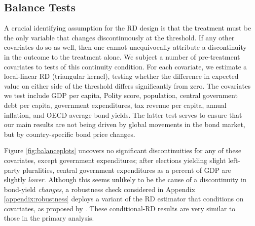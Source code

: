 \documentclass[12pt]{article}
\begin{document}
\subsection{Balance Tests}

A crucial identifying assumption for the RD design is that the treatment must be the only variable that changes discontinuously at the threshold. If any other covariates do so as well, then one cannot unequivocally attribute a discontinuity in the outcome to the treatment alone. We subject a number of pre-treatment covariates to tests of this continuity condition. For each covariate, we estimate a local-linear RD (triangular kernel), testing whether the difference in expected value on either side of the threshold differs significantly from zero. The covariates we test include GDP per capita, Polity score, population, central government debt per capita, government expenditures, tax revenue per capita, annual inflation, and OECD average bond yields. The latter test serves to ensure that our main results are not being driven by global movements in the bond market, but by country-specific bond price changes. 

Figure \ref{fig:balanceplots} uncovers no significant discontinuities for any of these covariates, except government expenditures; after elections yielding slight left-party pluralities, central government expenditures as a percent of GDP are slightly \textit{lower}. Although this seems unlikely to be the cause of a discontinuity in bond-yield \textit{changes}, a robustness check considered in Appendix \ref{appendix:robustness} deploys a variant of the RD estimator that conditions on covariates, as proposed by \citet{Calonico2018}. These conditional-RD results are very similar to those in the primary analysis.
\end{document}
